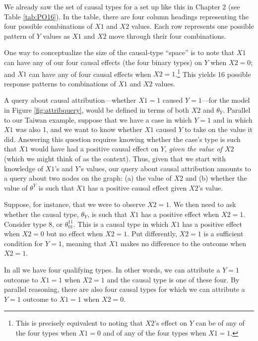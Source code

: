 \documentclass[
  12pt,
]{book}
\begin{document}
We already saw the set of causal types for a set up like this in Chapter 2 (see Table \ref{tab:PO16}). In the table, there are four column headings representing the four possible combinations of \(X1\) and \(X2\) values. Each row represents one possible pattern of \(Y\) values as \(X1\) and \(X2\) move through their four combinations.

One way to conceptualize the size of the causal-type ``space'' is to note that \(X1\) can have any of our four causal effects (the four binary types) on \(Y\) when \(X2=0\); and \(X1\) can have any of four causal effects when \(X2=1\).\footnote{This is precisely equivalent to noting that \(X2\)'s effect on \(Y\) can be of any of the four types when \(X1=0\) and of any of the four types when \(X1=1\).} This yields 16 possible response patterns to combinations of \(X1\) and \(X2\) values.

A query about causal attribution---whether \(X1 = 1\) caused \(Y=1\)---for the model in Figure \ref{fig:attribquery}, would be defined in terms of both \(X2\) and \(\theta_Y\). Parallel to our Taiwan example, suppose that we have a case in which \(Y=1\) and in which \(X1\) was also 1, and we want to know whether \(X1\) caused \(Y\) to take on the value it did. Answering this question requires knowing whether the case's type is such that \(X1\) would have had a positive causal effect on \(Y\), \emph{given the value of \(X2\)} (which we might think of as the context). Thus, given that we start with knowledge of \(X1\)'s and \(Y\)'s values, our query about causal attribution amounts to a query about two nodes on the graph: (a) the value of \(X2\) and (b) whether the value of \(\theta^Y\) is such that \(X1\) has a positive causal effect given \(X2\)'s value.

Suppose, for instance, that we were to observe \(X2=1\). We then need to ask whether the causal type, \(\theta_Y\), is such that \(X1\) has a positive effect when \(X2=1\). Consider type 8, or \(\theta_{01}^{11}\). This is a causal type in which \(X1\) has a positive effect when \(X2=0\) but no effect when \(X2=1\). Put differently, \(X2=1\) is a sufficient condition for \(Y=1\), meaning that \(X1\) makes no difference to the outcome when \(X2=1\).

In all we have four qualifying types. In other words, we can attribute a \(Y=1\) outcome to \(X1=1\) when \(X2=1\) and the causal type is one of these four. By parallel reasoning, there are also four causal types for which we can attribute a \(Y=1\) outcome to \(X1=1\) when \(X2=0\).
\end{document}
